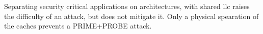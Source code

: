 Separating security critical applications on architectures, with shared
\gls{llc} raises the difficulty of an attack, but does not mitigate it.
Only a physical spearation of the caches prevents a PRIME+PROBE attack.






\begin{comment}
\begin{itemize}
  \item Assumptions: single ISA, no heterogeneous cores, SMP, one specific CPU
    architecture \checkmark
  \item Goals: load balancer providing isolation, stable execution times for the
    same workload, reduced congestion on shared resources, two balancing
    strategies: performance and low energy usage;
  \item introduce different approaches: speed balancing, symbiotic scheduling,
    congestion aware scheduling

    \begin{itemize}
      \item concisely introduce the work
      \item highlight the key aspects, goals, achievements
      \item relevant achievements I will use
      \item drawbacks of the work
    \end{itemize}
  \item symbiotic scheduling:
    \begin{itemize}
      \item term coined by \citeauthor{snavely_symbiotic_2000} in
	\citeyear{snavely_symbiotic_2000} \checkmark
      \item technique for SMT to improve performance of threads scheduled on
	two hardware sharing SMT cores \checkmark
      \item runs threads on two corresponding SMT cores and measures their
	performance in a simulator;
      \item explain performance, turnaround/response time. How measured?
	\checkmark
      \item sampling phase needs time, but can be done, while a default
	scheduler runs \checkmark
      \item restriction on changes in workload to ease sampling phase
      \item summarize all restrictions/assumptions
      \item select thread pairs/co-schedules for smt-core-pairs with most throughput for
	all threads
      \item try to combine workloads that use different cpu hardware
	units, e.g. fp workload and integer workload; heavy cache usage, little
	cache usage
      \item Measurements in their \citeyear{snavely_symbiotic_2000} paper use
	perf counters not present in real HW, e.g. conflicts inside FP units,
	FPqueue full.


\end{comment}
